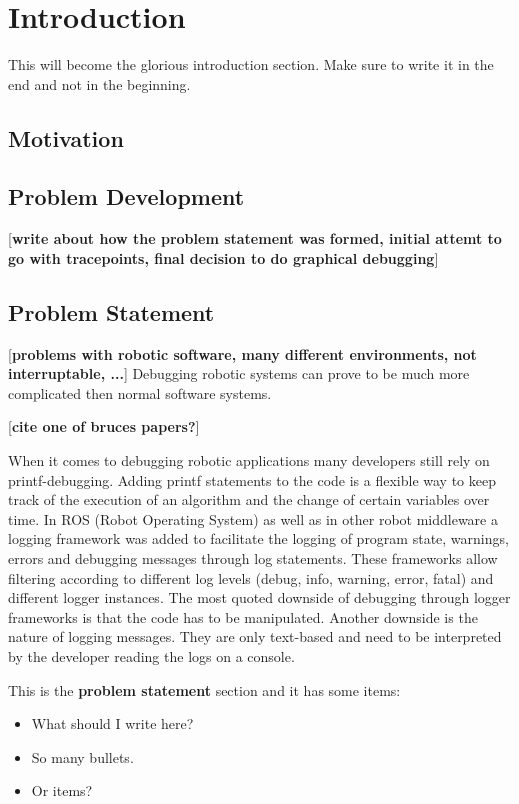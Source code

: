 \chapter{Introduction}

This will become the glorious introduction section. Make sure to write it in
the end and not in the beginning.

\section{Motivation}

\section{Problem Development}
[\textbf{write about how the problem statement was formed, initial attemt to go with tracepoints, final decision to do graphical debugging}]

\section{Problem Statement}
[\textbf{problems with robotic software, many different environments, not interruptable, ...}]
Debugging robotic systems can prove to be much more complicated then normal software systems. 

[\textbf{cite one of bruces papers?}]

When it comes to debugging robotic applications many developers still rely on printf-debugging. Adding printf statements to the code is a flexible way to keep track of the execution of an algorithm and the change of certain variables over time. In ROS (Robot Operating System) as well as in other robot middleware a logging framework was added to facilitate the logging of program state, warnings, errors and debugging messages through log statements. These frameworks allow filtering according to different log levels (debug, info, warning, error, fatal) and different logger instances. The most quoted downside of debugging through logger frameworks is that the code has to be manipulated. Another downside is the nature of logging messages. They are only text-based and need to be interpreted by the developer reading the logs on a console.

\label{problem_statement}
This is the \textbf{problem statement} section and it has some items:
\begin{itemize}
\item What should I write here?
\item So many bullets.
\item Or items?
\end{itemize}

